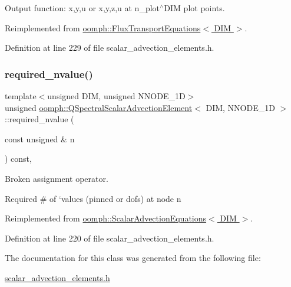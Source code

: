 Output function\+: x,y,u or x,y,z,u at n\+\_\+plot$^\wedge$\+D\+IM plot points. 



Reimplemented from \hyperlink{classoomph_1_1FluxTransportEquations_a6b9ea1eb9feb8c71c1d935c52e7d896f}{oomph\+::\+Flux\+Transport\+Equations$<$ D\+I\+M $>$}.



Definition at line 229 of file scalar\+\_\+advection\+\_\+elements.\+h.

\mbox{\label{classoomph_1_1QSpectralScalarAdvectionElement_a7467b1b382307bb0d40901519465b4b1}} 
\subsubsection{\texorpdfstring{required\+\_\+nvalue()}{required\_nvalue()}}
{\footnotesize\ttfamily template$<$unsigned D\+IM, unsigned N\+N\+O\+D\+E\+\_\+1D$>$ \\
unsigned \hyperlink{classoomph_1_1QSpectralScalarAdvectionElement}{oomph\+::\+Q\+Spectral\+Scalar\+Advection\+Element}$<$ D\+IM, N\+N\+O\+D\+E\+\_\+1D $>$\+::required\+\_\+nvalue (\begin{DoxyParamCaption}\item[{const unsigned \&}]{n }\end{DoxyParamCaption}) const\hspace{0.3cm}{\ttfamily [inline]}, {\ttfamily [virtual]}}



Broken assignment operator. 

Required \# of `values\textquotesingle{} (pinned or dofs) at node n 

Reimplemented from \hyperlink{classoomph_1_1ScalarAdvectionEquations_a71a3c28feb1156376cbf55e7043e27e8}{oomph\+::\+Scalar\+Advection\+Equations$<$ D\+I\+M $>$}.



Definition at line 220 of file scalar\+\_\+advection\+\_\+elements.\+h.



The documentation for this class was generated from the following file\+:\begin{DoxyCompactItemize}
\item 
\hyperlink{scalar__advection__elements_8h}{scalar\+\_\+advection\+\_\+elements.\+h}\end{DoxyCompactItemize}
